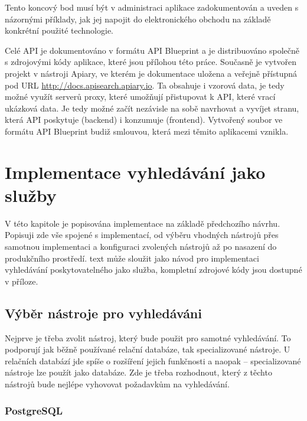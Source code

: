 \documentclass[FM,DP]{tulthesis}
\begin{document}
Tento koncový bod musí být v administraci aplikace zadokumentován a uveden s názornými 
příklady, jak jej napojit do elektronického obchodu na základě konkrétní použité technologie.

Celé API je dokumentováno v formátu API Blueprint a je distribuováno společně s zdrojovými
kódy aplikace, které jsou přílohou této práce. Současně je vytvořen projekt v nástroji 
Apiary, ve kterém je dokumentace uložena a veřejně přístupná pod URL 
\url{http://docs.apisearch.apiary.io}. Ta obsahuje i vzorová data, 
je tedy možné využít serverů proxy, které umožňují přistupovat k API, které vrací ukázková 
data. Je tedy možné začít nezávisle na sobě navrhovat a vyvíjet stranu, která API poskytuje
(backend) i konzumuje (frontend). Vytvořený soubor ve formátu API Blueprint budiž smlouvou, 
která mezi těmito aplikacemi vznikla.

%


\chapter{Implementace vyhledávání jako služby}

V této kapitole je popisována implementace na základě předchozího návrhu. Popisuji
zde vše spojené s implementací, od výběru vhodných nástrojů přes samotnou implementaci
a konfiguraci zvolených nástrojů až po nasazení do produkčního prostředí.
text může sloužit jako návod pro implementaci vyhledávání poskytovatelného jako
služba, kompletní zdrojové kódy jsou dostupné v příloze.

\section{Výběr nástroje pro vyhledáváni}

Nejprve je třeba zvolit nástroj, který bude použit pro samotné vyhledávání. To podporují 
jak běžně používané relační databáze, tak specializované nástroje. U relačních databází
jde spíše o rozšíření jejich funkčnosti a naopak -- specializované nástroje lze použít
jako databáze. Zde je třeba rozhodnout, který z těchto nástrojů bude nejlépe vyhovovat
požadavkům na vyhledávání.

\subsection{PostgreSQL}
\end{document}
